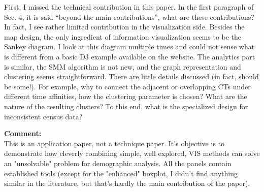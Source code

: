 \documentclass{article}
\newcommand{\reply}[1]{\begin{tcolorbox}\noindent\textbf{Comment:}\\#1\hfill\end{tcolorbox}}
\begin{document}
\begin{itemize}
{    First, I missed the technical contribution in this paper. In the first paragraph
    of Sec. 4, it is said ``beyond the main contributions'', what are these
    contributions? In fact, I see rather limited contribution in the visualization
    side. Besides the map design, the only ingredient of information visualization
    seems to be the Sankey diagram. I look at this diagram multiple times and could
    not sense what is different from a basic D3 example available on the website. The
    analytics part is similar, the SMM algorithm is not new, and the graph
    representation and clustering seems straightforward. There are little details
    discussed (in fact, should be some!). For example, why to connect the adjacent or
    overlapping CTs under different time affinities, how the clustering parameter is
    chosen? What are the nature of the resulting clusters? To this end, what is the
    specialized design for inconsistent census data?

    \reply{This is an application paper, not a technique paper. It's objective
    is to demonstrate how cleverly combining simple, well explored, VIS methods
    can solve an "unsolvable" problem for demographic analysis. All the panels
    contain established tools (except for the "enhanced" boxplot, I didn't find
    anything similar in the literature, but that's hardly the main contribution
    of the paper).}


}
\end{itemize}
\end{document}
